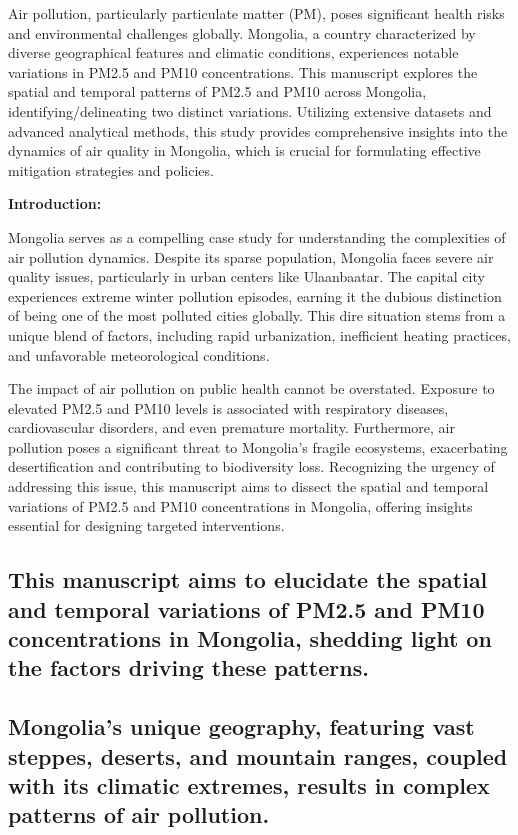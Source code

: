 \documentclass[
  number]{elsarticle}
\begin{document}
Air pollution, particularly particulate matter (PM), poses significant
health risks and environmental challenges globally. Mongolia, a country
characterized by diverse geographical features and climatic conditions,
experiences notable variations in PM2.5 and PM10 concentrations. This
manuscript explores the spatial and temporal patterns of PM2.5 and PM10
across Mongolia, identifying/delineating two distinct variations.
Utilizing extensive datasets and advanced analytical methods, this study
provides comprehensive insights into the dynamics of air quality in
Mongolia, which is crucial for formulating effective mitigation
strategies and policies.

\textbf{Introduction:}

Mongolia serves as a compelling case study for understanding the
complexities of air pollution dynamics. Despite its sparse population,
Mongolia faces severe air quality issues, particularly in urban centers
like Ulaanbaatar. The capital city experiences extreme winter pollution
episodes, earning it the dubious distinction of being one of the most
polluted cities globally. This dire situation stems from a unique blend
of factors, including rapid urbanization, inefficient heating practices,
and unfavorable meteorological conditions.

The impact of air pollution on public health cannot be overstated.
Exposure to elevated PM2.5 and PM10 levels is associated with
respiratory diseases, cardiovascular disorders, and even premature
mortality. Furthermore, air pollution poses a significant threat to
Mongolia's fragile ecosystems, exacerbating desertification and
contributing to biodiversity loss. Recognizing the urgency of addressing
this issue, this manuscript aims to dissect the spatial and temporal
variations of PM2.5 and PM10 concentrations in Mongolia, offering
insights essential for designing targeted interventions.

\subsection{This manuscript aims to elucidate the spatial and temporal
variations of PM2.5 and PM10 concentrations in Mongolia, shedding light
on the factors driving these
patterns.}\label{this-manuscript-aims-to-elucidate-the-spatial-and-temporal-variations-of-pm2.5-and-pm10-concentrations-in-mongolia-shedding-light-on-the-factors-driving-these-patterns.}

\subsection{Mongolia's unique geography, featuring vast steppes,
deserts, and mountain ranges, coupled with its climatic extremes,
results in complex patterns of air
pollution.}\label{mongolias-unique-geography-featuring-vast-steppes-deserts-and-mountain-ranges-coupled-with-its-climatic-extremes-results-in-complex-patterns-of-air-pollution.}
\end{document}
